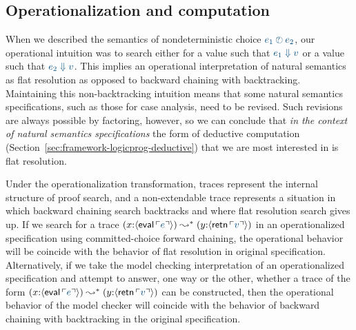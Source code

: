

\subsection{Operationalization and computation}
\label{sec:flatresolution}

When we described the semantics of nondeterministic choice $\obj{e_1
  \arb e_2}$, our operational intuition was to search either for a
value such that $\obj{e_1 \Downarrow v}$ or a value such that
$\obj{e_2 \Downarrow v}$. This implies an operational interpretation
of natural semantics as flat resolution as opposed to backward
chaining with backtracking. Maintaining this non-backtracking
intuition means that some natural semantics specifications, such as
those for case analysis, need to be revised. Such revisions are always
possible by factoring, however, so we can conclude that {\it in the
  context of natural semantics specifications} the form of deductive
computation (Section~\ref{sec:framework-logicprog-deductive}) that we
are most interested in is flat resolution.

Under the operationalization transformation, traces represent the
internal structure of proof search, and a non-extendable trace
represents a situation in which backward chaining search backtracks
and where flat resolution search gives up. If we search for a trace
$(x{:}\susp{{\sf eval}\,\interp{e}}) \leadsto^* (y{:}\susp{{\sf
    retn}\,\interp{v}})$ in an operationalized specification using
committed-choice forward chaining, the operational behavior will be
coincide with the behavior of flat resolution in original
specification. Alternatively, if we take the model checking
interpretation of an operationalized specification and attempt to
answer, one way or the other, whether a trace of the form
$(x{:}\susp{{\sf eval}\,\interp{e}}) \leadsto^* (y{:}\susp{{\sf
    retn}\,\interp{v}})$ can be constructed, then the operational
behavior of the model checker will coincide with the behavior of 
backward chaining with backtracking in the original specification.

